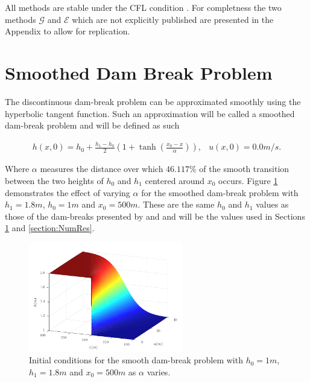 \documentclass[times]{elsarticle}
\begin{document}
All methods are stable under the CFL condition \cite{Harten-etal-1983-357}. For completness the two methods $\mathcal{G}$ and $\mathcal{E}$ which are not explicitly published are presented in the Appendix to allow for replication.

\section{Smoothed Dam Break Problem}
\label{section:smootheddambreak}

The discontinuous dam-break problem can be approximated smoothly using the hyperbolic tangent function. Such an approximation will be called a smoothed dam-break problem and will be defined as such
\begin{linenomath*}
\begin{subequations}
\begin{gather}
h(x,0) = h_0 + \frac{h_1 - h_0}{2}\left(1 + \tanh\left(\frac{x_0 - x}{\alpha}\right)\right),
\end{gather}
\begin{gather}
u(x,0) = 0.0m/s.
\end{gather}
\label{eq:sdbi}
\end{subequations}
\end{linenomath*}
Where $\alpha$ measures the distance over which $46.117\%$ of the smooth transition between the two heights of $h_0$ and $h_1$ centered around $x_0$ occurs. Figure \ref{fig:dbsmoothinit} demonstrates the effect of varying $\alpha$ for the smoothed dam-break problem with $h_1 =1.8m$, $h_0 = 1m$ and $x_0 = 500m$. These are the same $h_0$ and $h_1$ values as those of the dam-breaks presented by \cite{El-etal-2006} and \cite{Hank-etal-2010-2034} and will be the values used in Sections \ref{section:smootheddambreak} and \ref{section:NumRes}.
\begin{figure}
\centering
\includegraphics[width=0.6\textwidth]{pics/explainers/dbs.pdf}
\caption{Initial conditions for the smooth dam-break problem with $h_0 = 1m$, $h_1 = 1.8m$ and $x_0 =500m$ as $\alpha$ varies.}
\label{fig:dbsmoothinit}
\end{figure}
%
\end{document}
